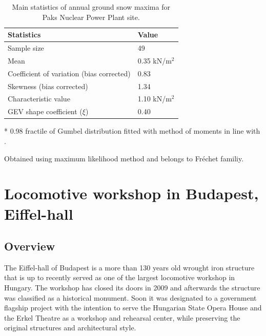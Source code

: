 \begin{table}
\caption{Main statistics of annual ground snow maxima for Paks Nuclear Power Plant site.}
\centering
\label{tab:paks_snow}
\small
	\begin{threeparttable}
    \begin{tabular}{m{}  m{}}
    \toprule
    Statistics  & Value \\
    \midrule
    \rowcolor{lightgrey} Sample size & 49 \\
    Mean & 0.35 kN/m$^2$ \\
    \rowcolor{lightgrey} Coefficient of variation (bias corrected) & 0.83 \\
    Skewness (bias corrected) & 1.34 \\
    \rowcolor{lightgrey} Characteristic value\tnote{*} & 1.10 kN/m$^2$ \\
    GEV shape coefficient ($\xi$)\tnote{\textdagger} & 0.40 \\
    \bottomrule
    \end{tabular}
    \begin{tablenotes}
    	\item[*] 0.98 fractile of Gumbel distribution fitted with method of moments in line with \citet{Sanpaolesi1998}.
	    \item[\textdagger] Obtained using maximum likelihood method and belongs to Fréchet familiy.  
   	\end{tablenotes}
   	\end{threeparttable}
\end{table}


\section{Locomotive workshop in Budapest, Eiffel-hall}
\label{sec:eiffel}

\subsection{Overview}
The Eiffel-hall of Budapest is a more than 130 years old wrought iron structure that is up to recently served as one of the largest locomotive workshop in Hungary. The workshop has closed its doors in 2009 and afterwards the structure was classified as a historical monument. Soon it was designated to a government flagship project with the intention to serve the Hungarian State Opera House and the Erkel Theatre as a workshop and rehearsal center, while preserving the original structures and architectural style.

